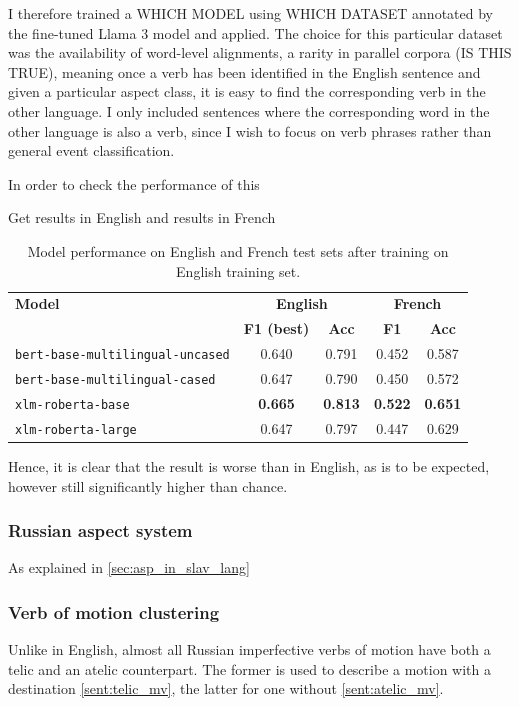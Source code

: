 I therefore trained a WHICH MODEL using WHICH DATASET annotated by the fine-tuned Llama 3 model and applied. The choice for this particular dataset was the availability of word-level alignments, a rarity in parallel corpora (IS THIS TRUE), meaning once a verb has been identified in the English sentence and given a particular aspect class, it is easy to find the corresponding verb in the other language. I only included sentences where the corresponding word in the other language is also a verb, since I wish to focus on verb phrases rather than general event classification.

In order to check the performance of this 

Get results in English and results in French

\begin{table}[h!]
    \centering
    \begin{tabular}{lcccc}
    \toprule
    \textbf{Model} & \multicolumn{2}{c}{\textbf{English}} & \multicolumn{2}{c}{\textbf{French}} \\
    \cmidrule(r){2-3} \cmidrule(r){4-5}
     & \textbf{F1 (best)} & \textbf{Acc} & \textbf{F1} & \textbf{Acc} \\
    \midrule
    \texttt{bert-base-multilingual-uncased} & 0.640 & 0.791 & 0.452 & 0.587 \\
    \texttt{bert-base-multilingual-cased}   & 0.647 & 0.790 & 0.450 & 0.572 \\
    \texttt{xlm-roberta-base}               & \textbf{0.665} & \textbf{0.813} & \textbf{0.522} & \textbf{0.651} \\
    \texttt{xlm-roberta-large}              & 0.647 & 0.797 & 0.447 & 0.629 \\
    \bottomrule
    \end{tabular}
    \caption{Model performance on English and French test sets after training on English training set.}
    \label{tab:performance}
    \end{table}

Hence, it is clear that the result is worse than in English, as is to be expected, however still significantly higher than chance.

\subsubsection{Russian aspect system}
As explained in \ref{sec:asp_in_slav_lang}


\subsubsection{Verb of motion clustering}
Unlike in English, almost all Russian imperfective verbs of motion have both a telic and an atelic counterpart. The former is used to describe a motion with a destination \ref{sent:telic_mv}, the latter for one without \ref{sent:atelic_mv}.

